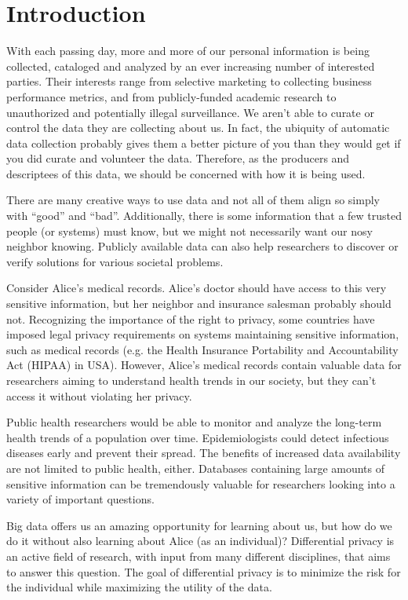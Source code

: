 \documentclass[12pt]{report}
\begin{document}
\chapter{Introduction}\label{sec:introduction}

With each passing day, more and more of our personal information is being collected, cataloged and analyzed by an ever increasing number of interested parties.
Their interests range from selective marketing to collecting business performance metrics, and from publicly-funded academic research to unauthorized and potentially illegal surveillance.
We aren't able to curate or control the data they are collecting about us.
In fact, the ubiquity of automatic data collection probably gives them a better picture of you than they would get if you did curate and volunteer the data.
Therefore, as the producers and descriptees of this data, we should be concerned with how it is being used.

There are many creative ways to use data and not all of them align so simply with ``good'' and ``bad''.
Additionally, there is some information that a few trusted people (or systems) must know, but we might not necessarily want our nosy neighbor knowing.
Publicly available data can also help researchers to discover or verify solutions for various societal problems.

Consider Alice's medical records.
Alice's doctor should have access to this very sensitive information, but her neighbor and insurance salesman probably should not.
Recognizing the importance of the right to privacy, some countries have imposed legal privacy requirements on systems maintaining sensitive information, such as medical records (e.g. the Health Insurance Portability and Accountability Act (HIPAA) in USA).
However, Alice's medical records contain valuable data for researchers aiming to understand health trends in our society, but they can't access it without violating her privacy.

Public health researchers would be able to monitor and analyze the long-term health trends of a population over time.
Epidemiologists could detect infectious diseases early and prevent their spread.
The benefits of increased data availability are not limited to public health, either.
Databases containing large amounts of sensitive information can be tremendously valuable for researchers looking into a variety of important questions.

Big data offers us an amazing opportunity for learning about us, but how do we do it without also learning about Alice (as an individual)?
Differential privacy is an active field of research, with input from many different disciplines, that aims to answer this question\cite{journals/cacm/Dwork11}.
The goal of differential privacy is to minimize the risk for the individual while maximizing the utility of the data.
\end{document}

